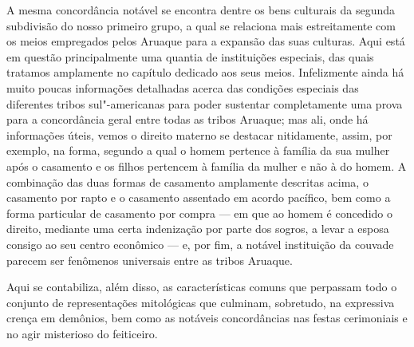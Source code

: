 A mesma concordância notável se encontra dentre os bens culturais da
segunda subdivisão do nosso primeiro grupo, a qual se relaciona mais
estreitamente com os meios empregados pelos Aruaque para a expansão das
suas culturas. Aqui está em questão principalmente uma quantia de
instituições especiais, das quais tratamos amplamente no capítulo
dedicado aos seus meios. Infelizmente ainda há muito poucas informações
detalhadas acerca das condições especiais das diferentes tribos
sul"-americanas para poder sustentar completamente uma prova para a
concordância geral entre todas as tribos Aruaque; mas ali, onde há
informações úteis, vemos o direito materno se destacar nitidamente,
assim, por exemplo, na forma, segundo a qual o homem pertence à família
da sua mulher após o casamento e os filhos pertencem à família da
mulher e não à do homem. A combinação das duas formas de casamento
amplamente descritas acima, o casamento por rapto e o casamento
assentado em acordo pacífico, bem como a forma particular de casamento
por compra --- em que ao homem é concedido o direito, mediante uma certa
indenização por parte dos sogros, a levar a esposa consigo ao seu centro
econômico --- e, por fim, a notável instituição da couvade parecem ser
fenômenos universais entre as tribos Aruaque.

Aqui se contabiliza, além disso, as características comuns que perpassam
todo o conjunto de representações mitológicas que culminam, sobretudo,
na expressiva crença em demônios, bem como as notáveis concordâncias nas
festas cerimoniais e no agir misterioso do feiticeiro.

